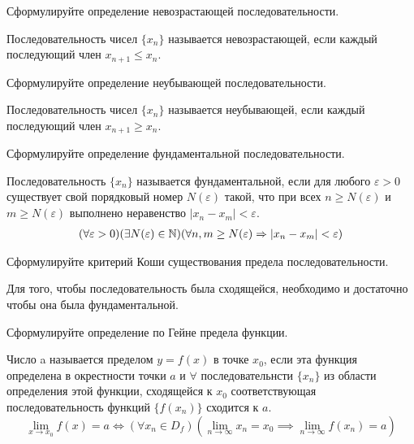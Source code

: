 \begin{question}
  Сформулируйте определение невозрастающей последовательности.
\end{question}
\begin{answer}
  Последовательность чисел $\{x_{n}\}$ называется невозрастающей, если каждый последующий член $x_{n+1} \le x_{n}$.
\end{answer}

\begin{question}
  Сформулируйте определение неубывающей последовательности.
\end{question}
\begin{answer}
  Последовательность чисел $\{x_{n}\}$ называется неубывающей, если каждый последующий член $x_{n+1} \ge x_{n}$.
\end{answer}

\begin{question}
  Сформулируйте определение фундаментальной последовательности.
\end{question}
\begin{answer}
  Последовательность $\{x_{n}\}$ называется фундаментальной, если для любого $\varepsilon > 0$ существует свой порядковый номер $N(\varepsilon)$ такой, что при всех $n \ge N(\varepsilon)$ и $m \ge N(\varepsilon)$ выполнено неравенство $|x_{n} - x_{m}| < \varepsilon$. 
  \begin{gather*}
    (\forall \varepsilon > 0)(\exists N(\varepsilon) \in \mathbb{N})(\forall n, m \ge N(\varepsilon) \Rightarrow |x_{n} - x_{m}| < \varepsilon)
  \end{gather*}
\end{answer}

\begin{question}
  Сформулируйте критерий Коши существования предела последовательности.
\end{question}
\begin{answer}
  Для того, чтобы последовательность была сходящейся, необходимо и достаточно чтобы она была фундаментальной.
\end{answer}

\begin{question}
  Сформулируйте определение по Гейне предела функции.
\end{question}
\begin{answer}
  Число a называется пределом $y=f(x)$ в точке $x_0$, если эта функция определена в окрестности точки $a$ и $\forall$ последовательнсти $\{x_n\}$ из области определения этой функции, сходящейся к $x_0$ соответствующая последовательность функций $\{f(x_{n})\}$ сходится к $a$. \[
    \lim_{x \to x_0} f(x) = a \iff (\forall x_{n} \in D_f)(\lim_{n \to \infty} x_{n} = x_{0} \implies \lim_{n \to \infty} f(x_{n}) = a)
\] 
\end{answer}

